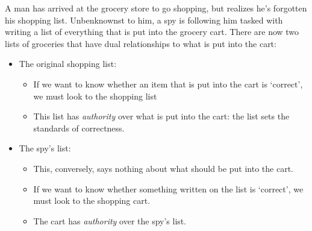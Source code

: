 A man has arrived at the grocery store to go shopping, but realizes he's forgotten his shopping list. Unbenknownst to him, a spy is following him tasked with writing a list of everything that is put into the grocery cart. There are now two lists of groceries that have dual relationships to what is put into the cart:

\begin{itemize}
\item The original shopping list: \begin{itemize}
\item If we want to know whether an item that is put into the cart is `correct', we must look to the shopping list
\item This list has \emph{authority} over what is put into the cart: the list sets the standards of correctness.
\end{itemize}
\item The spy's list: \begin{itemize}
\item This, conversely, says nothing about what should be put into the cart.
\item If we want to know whether something written on the list is `correct', we must look to the shopping cart.
\item The cart has \emph{authority} over the spy's list.
\end{itemize}
\end{itemize}